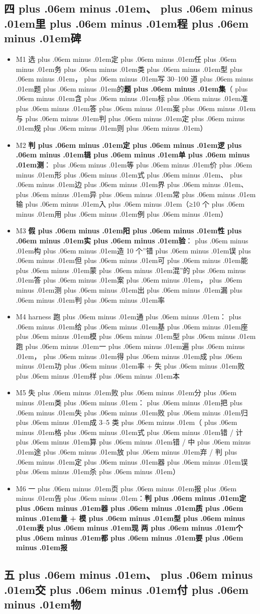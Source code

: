 \documentclass[
]{article}
\providecommand{\tightlist}{%
  \setlength{\itemsep}{0pt}\setlength{\parskip}{0pt}}
\def\zh#1{{\zhfont #1}}
\def\sym#1{{\symfont #1}}
\def\zhglue{\hskip0pt plus .06em minus .01em}
\begin{document}
\subsection{\zh{四\zhglue 、\zhglue 里\zhglue 程\zhglue 碑}}\label{ux56dbux91ccux7a0bux7891}

\begin{itemize}
\tightlist
\item[$\square$]
  M1 \zh{选\zhglue 定\zhglue 任\zhglue 务\zhglue 类\zhglue 型\zhglue ，\zhglue 写} 30--100 \zh{道\zhglue 题\zhglue 的}\textbf{\zh{题\zhglue 集}}\zh{（\zhglue 含\zhglue 标\zhglue 准\zhglue 答\zhglue 案\zhglue 与\zhglue 判\zhglue 定\zhglue 规\zhglue 则\zhglue ）}
\item[$\square$]
  M2 \textbf{\zh{判\zhglue 定\zhglue 逻\zhglue 辑\zhglue 单\zhglue 测}}\zh{：\zhglue 等\zhglue 价\zhglue 形\zhglue 式\zhglue 、\zhglue 边\zhglue 界\zhglue 、\zhglue 异\zhglue 常\zhglue 输\zhglue 入\zhglue （}\sym{≥}10 \zh{个\zhglue 用\zhglue 例\zhglue ）}
\item[$\square$]
  M3 \textbf{\zh{假\zhglue 阳\zhglue 性\zhglue 实\zhglue 验}}\zh{：\zhglue 构\zhglue 造} 10 \zh{个}''\zh{错\zhglue 误\zhglue 但\zhglue 可\zhglue 能\zhglue 蒙\zhglue 混}''\zh{的\zhglue 答\zhglue 案\zhglue ，\zhglue 测\zhglue 出\zhglue 漏\zhglue 判\zhglue 率}
\item[$\square$]
  M4 harness \zh{跑\zhglue 通\zhglue ：\zhglue 给\zhglue 基\zhglue 座\zhglue 模\zhglue 型\zhglue 跑\zhglue 一\zhglue 遍\zhglue ，\zhglue 得\zhglue 成\zhglue 功\zhglue 率} + \zh{失\zhglue 败\zhglue 样\zhglue 本}
\item[$\square$]
  M5 \zh{失\zhglue 败\zhglue 分\zhglue 类\zhglue ：\zhglue 把\zhglue 失\zhglue 败\zhglue 归\zhglue 成} 3--5 \zh{类\zhglue （\zhglue 格\zhglue 式\zhglue 错} / \zh{计\zhglue 算\zhglue 错} / \zh{中\zhglue 途\zhglue 放\zhglue 弃} / \zh{判\zhglue 定\zhglue 器\zhglue 误\zhglue 杀\zhglue ）}
\item[$\square$]
  M6 \zh{一\zhglue 页\zhglue 报\zhglue 告\zhglue ：}\textbf{\zh{判\zhglue 定\zhglue 器\zhglue 质\zhglue 量} + \zh{模\zhglue 型\zhglue 表\zhglue 现} \zh{两\zhglue 个\zhglue 都\zhglue 要\zhglue 报}}
\end{itemize}

\subsection{\zh{五\zhglue 、\zhglue 交\zhglue 付\zhglue 物}}\label{ux4e94ux4ea4ux4ed8ux7269}
\end{document}
